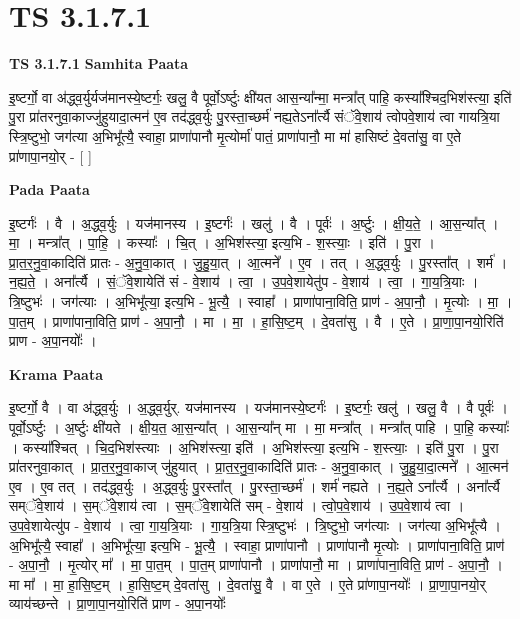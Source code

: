 \documentclass[17pt]{extarticle}
\begin{document}
\section{ TS 3.1.7.1 }

\textbf{TS 3.1.7.1 } \newline
\textbf{Samhita Paata} \newline

इ॒ष्टर्गो॒ वा अ॑द्ध्व॒र्युर्यज॑मानस्ये॒ष्टर्गः॒ खलु॒ वै पूर्वो॒ऽर्ष्टुः क्षी॑यत आस॒न्या᳚न्मा॒ मन्त्रा᳚त् पाहि॒ कस्या᳚श्चिद॒भिश॑स्त्या॒ इति॑ पु॒रा प्रा॑तरनुवा॒काज्जु॑हुयादा॒त्मन॑ ए॒व तद॑द्ध्व॒र्युः पु॒रस्ता॒च्छर्म॑ नह्य॒तेऽना᳚र्त्यै संॅवे॒शाय॑ त्वोपवे॒शाय॑ त्वा गायत्रि॒या स्त्रि॒ष्टुभो॒ जग॑त्या अ॒भिभू᳚त्यै॒ स्वाहा॒ प्राणा॑पानौ मृ॒त्योर्मा॑ पातं॒ प्राणा॑पानौ॒ मा मा॑ हासिष्टं दे॒वता॑सु॒ वा ए॒ते प्रा॑णापा॒नयो॒र् - [  ] \newline

\textbf{Pada Paata} \newline

इ॒ष्टर्गः॑ । वै । अ॒द्ध्व॒र्युः । यज॑मानस्य । इ॒ष्टर्गः॑ । खलु॑ । वै । पूर्वः॑ । अ॒र्ष्टुः । क्षी॒य॒ते॒ । आ॒स॒न्या᳚त् । मा॒ । मन्त्रा᳚त् । पा॒हि॒ । कस्याः᳚ । चि॒त् । अ॒भिश॑स्त्या॒ इत्य॒भि - श॒स्त्याः॒ । इति॑ । पु॒रा । प्रा॒त॒र॒नु॒वा॒कादिति॑ प्रातः - अ॒नु॒वा॒कात् । जु॒हु॒या॒त् । आ॒त्मने᳚ । ए॒व । तत् । अ॒द्ध्व॒र्युः । पु॒रस्ता᳚त् । शर्म॑ । न॒ह्य॒ते॒ । अना᳚र्त्यै । सं॒ॅवे॒शायेति॑ सं - वे॒शाय॑ । त्वा॒ । उ॒प॒वे॒शायेतु॑प - वे॒शाय॑ । त्वा॒ । गा॒य॒त्रि॒याः । त्रि॒ष्टुभः॑ । जग॑त्याः । अ॒भिभू᳚त्या॒ इत्य॒भि - भू॒त्यै॒ । स्वाहा᳚ । प्राणा॑पाना॒विति॒ प्राण॑ - अ॒पा॒नौ॒ । मृ॒त्योः । मा॒ । पा॒त॒म् । प्राणा॑पाना॒विति॒ प्राण॑ - अ॒पा॒नौ॒ । मा । मा॒ । हा॒सि॒ष्ट॒म् । दे॒वता॑सु । वै । ए॒ते । प्रा॒णा॒पा॒नयो॒रिति॑ प्राण - अ॒पा॒नयोः᳚ ।  \newline


\textbf{Krama Paata} \newline

इ॒ष्टर्गो॒ वै । वा अ॑द्ध्व॒र्युः । अ॒द्ध्व॒र्युर्. यज॑मानस्य । यज॑मानस्ये॒ष्टर्गः॑ । इ॒ष्टर्गः॒ खलु॑ । खलु॒ वै । वै पूर्वः॑ । पूर्वो॒ऽर्ष्टुः । अ॒र्ष्टुः क्षी॑यते । क्षी॒य॒त॒ आ॒स॒न्या᳚त् । आ॒स॒न्या᳚न् मा । मा॒ मन्त्रा᳚त् । मन्त्रा᳚त् पाहि । पा॒हि॒ कस्याः᳚ । कस्या᳚श्चित् । चि॒द॒भिश॑स्त्याः । अ॒भिश॑स्त्या॒ इति॑ । अ॒भिश॑स्त्या॒ इत्य॒भि - श॒स्त्याः॒ । इति॑ पु॒रा । पु॒रा प्रा॑तरनुवा॒कात् । प्रा॒त॒र॒नु॒वा॒काज् जु॑हुयात् । प्रा॒त॒र॒नु॒वा॒कादिति॑ प्रातः - अ॒नु॒वा॒कात् । जु॒हु॒या॒दा॒त्मने᳚ । आ॒त्मन॑ ए॒व । ए॒व तत् । तद॑द्ध्व॒र्युः । अ॒द्ध्व॒र्युः पु॒रस्ता᳚त् । पु॒रस्ता॒च्छर्म॑ । शर्म॑ नह्यते । न॒ह्य॒ते ऽना᳚र्त्यै । अना᳚र्त्यै सम्ॅवे॒शाय॑ । 
स॒म्ॅवे॒शाय॑ त्वा । स॒म्ॅवे॒शायेति॑ सम् - वे॒शाय॑ । त्वो॒प॒वे॒शाय॑ । उ॒प॒वे॒शाय॑ त्वा । उ॒प॒वे॒शायेत्यु॑प - वे॒शाय॑ । त्वा॒ गा॒य॒त्रि॒याः । गा॒य॒त्रि॒या स्त्रि॒ष्टुभः॑ । त्रि॒ष्टुभो॒ जग॑त्याः । जग॑त्या अ॒भिभू᳚त्यै । अ॒भिभू᳚त्यै॒ स्वाहा᳚ । अ॒भिभू᳚त्या॒ इत्य॒भि - भू॒त्यै॒ । स्वाहा॒ प्राणा॑पानौ । प्राणा॑पानौ मृ॒त्योः । प्राणा॑पाना॒विति॒ प्राण॑ - अ॒पा॒नौ॒ । मृ॒त्योर् मा᳚ । मा॒ पा॒त॒म् । पा॒त॒म् प्राणा॑पानौ । प्राणा॑पानौ॒ मा । प्राणा॑पाना॒विति॒ प्राण॑ - अ॒पा॒नौ॒ । मा मा᳚ । मा॒ हा॒सि॒ष्ट॒म् । हा॒सि॒ष्ट॒म् दे॒वता॑सु । दे॒वता॑सु॒ वै । वा ए॒ते । ए॒ते प्रा॑णापा॒नयोः᳚ । प्रा॒णा॒पा॒नयो॒र् व्याय॑च्छन्ते । प्रा॒णा॒पा॒नयो॒रिति॑ प्राण - अ॒पा॒नयोः᳚ \newline
\end{document}

